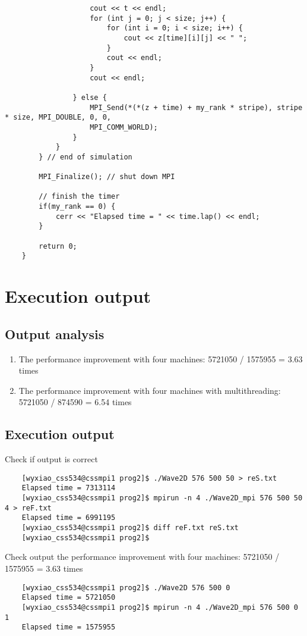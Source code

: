 \documentclass[11pt, letterpaper]{article}
\begin{document}
\begin{lstlisting}
					cout << t << endl;
					for (int j = 0; j < size; j++) {
						for (int i = 0; i < size; i++) {
							cout << z[time][i][j] << " ";
						}
						cout << endl;
					}
					cout << endl;
				
				} else {
					MPI_Send(*(*(z + time) + my_rank * stripe), stripe * size, MPI_DOUBLE, 0, 0,
					MPI_COMM_WORLD);
				}
			}
		} // end of simulation
		
		MPI_Finalize(); // shut down MPI
		
		// finish the timer
		if(my_rank == 0) {
			cerr << "Elapsed time = " << time.lap() << endl;
		}
		
		return 0;
	}
	\end{lstlisting}
	
	
	
	\section {Execution output}
	\subsection{Output analysis}
	\begin{enumerate} 
		\item The performance improvement with four machines: 5721050 / 1575955 = 3.63 times
		\item The performance improvement with four machines with multithreading: 5721050 / 874590 = 6.54 times
	\end{enumerate}
	
	\subsection{Execution output}
	\noindent \large Check if output is correct
	\vspace{-0.2in}
	\begin{lstlisting}
	[wyxiao_css534@cssmpi1 prog2]$ ./Wave2D 576 500 50 > reS.txt
	Elapsed time = 7313114
	[wyxiao_css534@cssmpi1 prog2]$ mpirun -n 4 ./Wave2D_mpi 576 500 50 4 > reF.txt
	Elapsed time = 6991195
	[wyxiao_css534@cssmpi1 prog2]$ diff reF.txt reS.txt
	[wyxiao_css534@cssmpi1 prog2]$
	\end{lstlisting}
	
	\noindent \large Check output the performance improvement with four machines: 5721050 / 1575955 = 3.63 times
	\vspace{-0.2in}
	\begin{lstlisting}
	[wyxiao_css534@cssmpi1 prog2]$ ./Wave2D 576 500 0
	Elapsed time = 5721050
	[wyxiao_css534@cssmpi1 prog2]$ mpirun -n 4 ./Wave2D_mpi 576 500 0 1
	Elapsed time = 1575955
	\end{lstlisting}
	
\end{document}
